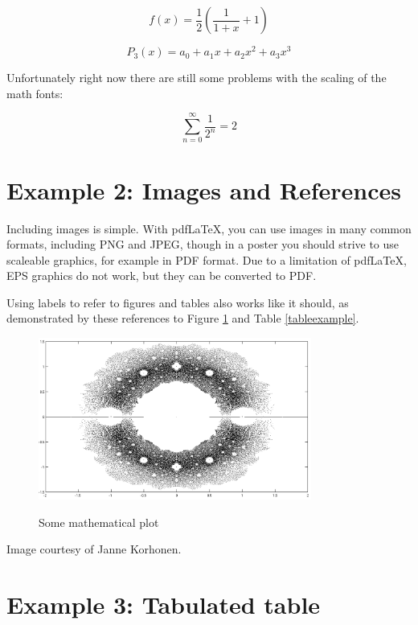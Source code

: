 \documentclass[final]{beamer}
\begin{document}
\begin{poster}
\begin{equation}
	f(x) = \frac{1}{2}\left(\frac{1}{1+x} + 1\right)
\end{equation}

\begin{equation}
	P_3(x) = a_0 + a_1 x + a_2 x^2 + a_3 x^3
\end{equation}

Unfortunately right now there are still some problems with the scaling of the math fonts:

\begin{equation}
	\sum_{n=0}^\infty \frac{1}{2^n} = 2
\end{equation}



\section{Example 2: Images and References}
Including images is simple.  With pdf\LaTeX, you can use images in many common formats, including PNG and JPEG, though in a poster you should strive to use scaleable graphics, for example in PDF format. Due to a limitation of pdf\LaTeX, EPS graphics do not work, but they can be converted to PDF.
	
Using labels to refer to figures and tables also works like it should, as demonstrated by these references to Figure \ref{examplefigure} and Table \ref{tableexample}.

\begin{figure}
\includegraphics[width=0.8\textwidth]{zeros.png}
\label{examplefigure}
\caption{Some mathematical plot}
\end{figure}

Image courtesy of Janne Korhonen.


\section{Example 3: Tabulated table}


\end{poster}
\end{document}
